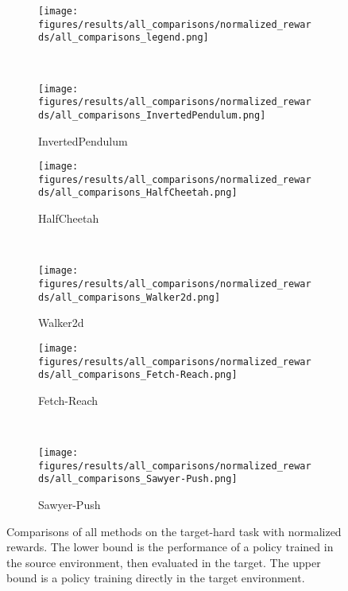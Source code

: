 \begin{figure}[ht]
    \centering
    \begin{subfigure}[t]{\linewidth}
        \centering
        \texttt{[image: figures/results/all\_comparisons/normalized\_rewards/all\_comparisons\_legend.png]}
    \end{subfigure}
    \\
    \begin{subfigure}[t]{0.45\linewidth}
        \centering
        \texttt{[image: figures/results/all\_comparisons/normalized\_rewards/all\_comparisons\_InvertedPendulum.png]}
        \caption{InvertedPendulum}
        \label{fig:result_step_norm:invertedpendulum}
    \end{subfigure}
    \begin{subfigure}[t]{0.45\linewidth}
        \centering
        \texttt{[image: figures/results/all\_comparisons/normalized\_rewards/all\_comparisons\_HalfCheetah.png]}
        \caption{HalfCheetah}
        \label{fig:result_step_norm:halfcheetah}
    \end{subfigure}
    \\
    \begin{subfigure}[t]{0.45\linewidth}
        \centering
        \texttt{[image: figures/results/all\_comparisons/normalized\_rewards/all\_comparisons\_Walker2d.png]}
        \caption{Walker2d}
        \label{fig:result_step_norm:walker2d}
    \end{subfigure}
    \begin{subfigure}[t]{0.45\linewidth}
        \centering
        \texttt{[image: figures/results/all\_comparisons/normalized\_rewards/all\_comparisons\_Fetch-Reach.png]}
        \caption{Fetch-Reach}
        \label{fig:result_step_norm:fetchreach}
    \end{subfigure}
    \\
    \begin{subfigure}[t]{0.45\linewidth}
        \centering
        \texttt{[image: figures/results/all\_comparisons/normalized\_rewards/all\_comparisons\_Sawyer-Push.png]}
        \caption{Sawyer-Push}
        \label{fig:result_step_norm:sawyer_push}
    \end{subfigure}
    \caption{
        Comparisons of all methods on the target-hard task with normalized rewards.  The lower bound is the performance of a policy trained in the source environment, then evaluated in the target.  The upper bound is a policy training directly in the target environment.
    }
\label{fig:result_step_norm}
\end{figure}



